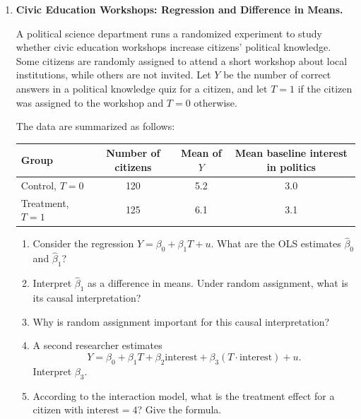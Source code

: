 \documentclass[12pt]{article}
\begin{document}
\begin{enumerate}
\begin{enumerate}[label=(\alph*)]
        \item This is outside range, because 65 is higher than the maximum value of \texttt{rent\_burden} observed in the estimation sample, which is 55. This matters because the model would be extrapolating beyond the data used to estimate the relationship.

        \item One possible transformed linear model is
        \[
            \text{support}
            = \beta_0 + \beta_1\text{rent\_burden}
            + \beta_2\text{rent\_burden}^2
            + \beta_3\text{urban} + u.
        \]
        This model allows the effect of rent burden to be nonlinear, but it is still linear in the parameters \(\beta_0, \beta_1, \beta_2, \beta_3\).
    \end{enumerate}
    \fi \color{black}

    \item \textbf{Civic Education Workshops: Regression and Difference in Means.}

    A political science department runs a randomized experiment to study whether civic education workshops increase citizens' political knowledge. Some citizens are randomly assigned to attend a short workshop about local institutions, while others are not invited. Let \(Y\) be the number of correct answers in a political knowledge quiz for a citizen, and let \(T=1\) if the citizen was assigned to the workshop and \(T=0\) otherwise.

    The data are summarized as follows:
    \begin{center}
    \begin{tabular}{lccc}
        \toprule
        Group & Number of citizens & Mean of \(Y\) & Mean baseline interest in politics \\
        \midrule
        Control, \(T=0\) & 120 & 5.2 & 3.0 \\
        Treatment, \(T=1\) & 125 & 6.1 & 3.1 \\
        \bottomrule
    \end{tabular}
    \end{center}

    \begin{enumerate}[label=(\alph*)]
        \item Consider the regression \(Y = \beta_0 + \beta_1T + u\). What are the OLS estimates \(\widehat\beta_0\) and \(\widehat\beta_1\)?
        \item Interpret \(\widehat\beta_1\) as a difference in means. Under random assignment, what is its causal interpretation?
        \item Why is random assignment important for this causal interpretation?
        \item A second researcher estimates
        \[
            Y = \beta_0 + \beta_1T + \beta_2\text{interest}
            + \beta_3(T\cdot \text{interest}) + u.
        \]
        Interpret \(\beta_3\).
        \item According to the interaction model, what is the treatment effect for a citizen with \(\text{interest}=4\)? Give the formula.
    \end{enumerate}


\end{enumerate}
\end{document}
